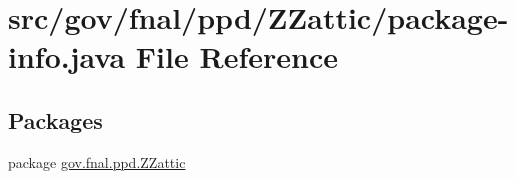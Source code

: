 \hypertarget{gov_2fnal_2ppd_2ZZattic_2package-info_8java}{\section{src/gov/fnal/ppd/\-Z\-Zattic/package-\/info.java File Reference}
\label{gov_2fnal_2ppd_2ZZattic_2package-info_8java}
}
\subsection*{Packages}
\begin{DoxyCompactItemize}
\item 
package \hyperlink{namespacegov_1_1fnal_1_1ppd_1_1ZZattic}{gov.\-fnal.\-ppd.\-Z\-Zattic}
\end{DoxyCompactItemize}
